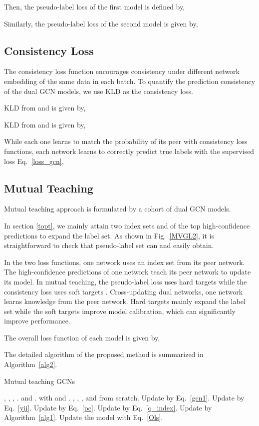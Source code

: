 \documentclass{article}
\begin{document}
Then, the pseudo-label loss of the first model is defined by,


Similarly, the pseudo-label loss of the second model is given by,

\subsection{Consistency Loss}
The consistency loss function encourages consistency under different network embedding of the same data in each batch. To quantify the prediction consistency of the dual GCN models, we use KLD as the consistency loss.

KLD from  and  is given by,


KLD from  and  is given by,


While each one learns to match the probability of its peer with consistency loss functions, each network learns to correctly predict true labels with the supervised loss Eq.~\eqref{loss_gcn},
\subsection{Mutual Teaching}
Mutual teaching approach is formulated by a cohort of dual GCN models.

In section \ref{topt}, we mainly attain two index sets  and  of the top  high-confidence predictions to expand the label set. As shown in Fig.~\ref{MVGL2}, it is straightforward to check that pseudo-label set can   and  easily obtain.

In the two loss functions, one network uses an index set from its peer network. The high-confidence predictions of one network teach its peer network to update its model. In mutual teaching, the pseudo-label loss uses hard targets  while the consistency loss uses soft targets . Cross-updating dual networks, one network learns knowledge from the peer network. Hard targets mainly expand the label set while the soft targets improve model calibration, which can significantly improve performance.

The overall loss function of each model is given by,



The detailed algorithm of the proposed method is summarized in Algorithm~\ref{alg2}.
\begin{algorithm}[ht]
\caption{Mutual teaching GCNs}\label{alg2}
\begin{algorithmic}[1]
 , , , .
  and .
  with  and . , , , and  from scratch.
\For{}
    \For{}
        \State Update  by Eq.~\eqref{gcn1}.
        \State Update  by Eq.~\eqref{yij}.
        \State Update  by Eq.~\eqref{pc}.
        \State Update  by Eq.~\eqref{q_index}.
        \State Update  by Algorithm~\ref{alg1}.
    \EndFor
    \For{}
        \State Update the model with  Eq.~\eqref{Ols}.
    \EndFor
\EndFor
\end{algorithmic}
\end{algorithm}
\end{document}
